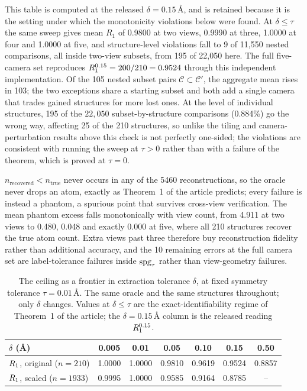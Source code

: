 This table is computed at the released $\delta = 0.15$\,\AA{}, and is
retained because it is the setting under which the monotonicity violations below were found. At
$\delta \le \tau$ the same sweep gives mean $R_1$ of 0.9800 at two views, 0.9990 at three, 1.0000 at four and
1.0000 at five, and structure-level violations fall to 9 of 11{,}550 nested comparisons, all inside two-view
subsets, from 195 of 22{,}050 here. The full five-camera set reproduces $R_1^{0.15} = 200/210 = 0.9524$ through
this independent implementation. Of the 105 nested subset pairs $\mathcal{C}\subset\mathcal{C}'$, the aggregate mean
rises in 103; the two exceptions share a starting subset and both add a single camera that trades gained
structures for more lost ones. At the level of individual structures, 195 of the $22{,}050$
subset-by-structure comparisons (0.884\%) go the wrong way, affecting 25 of the 210 structures, so unlike
the tiling and camera-perturbation results above this check is not perfectly one-sided; the violations are
consistent with running the sweep at $\tau>0$ rather than with a failure of the theorem, which is proved at
$\tau=0$.

$n_{\mathrm{recovered}} < n_{\mathrm{true}}$ never occurs in any of the 5460 reconstructions, so the oracle
never drops an atom, exactly as Theorem~1 of the article predicts; every failure is instead a phantom, a
spurious point that survives cross-view verification. The mean phantom excess falls monotonically with
view count, from 4.911 at two views to 0.480, 0.048 and exactly 0.000 at five, where all 210 structures
recover the true atom count. Extra views past three therefore buy reconstruction fidelity rather than
additional accuracy, and the 10 remaining errors at the full camera set are label-tolerance failures inside
$\mathrm{spg}_\tau$ rather than view-geometry failures.

\begin{table}[htbp]
\centering
\caption{The ceiling as a frontier in extraction tolerance $\delta$, at fixed symmetry tolerance
$\tau = 0.01$\,\AA{}. The same oracle and the same structures throughout; only $\delta$ changes. Values at
$\delta \le \tau$ are the exact-identifiability regime of Theorem~1 of the article; the $\delta = 0.15$\,\AA{}
column is the released reading $\RoneRel$.}
\label{tab:frontier}
\small
\begin{tabular}{@{}l S[table-format=1.4] S[table-format=1.4] S[table-format=1.4] S[table-format=1.4] S[table-format=1.4] S[table-format=1.4]@{}}
\toprule
$\delta$ (\AA{}) & {0.005} & {0.01} & {0.05} & {0.10} & {0.15} & {0.50} \\
\midrule
$R_1$, original ($n = 210$)   & 1.0000 & 1.0000 & 0.9810 & 0.9619 & 0.9524 & 0.8857 \\
$R_1$, scaled ($n = 1933$)    & 0.9995 & 1.0000 & 0.9585 & 0.9164 & 0.8785 & {--} \\
\bottomrule
\end{tabular}
\end{table}

